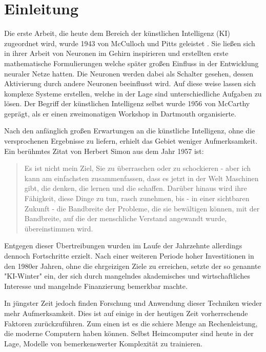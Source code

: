 \section{Einleitung}

Die erste Arbeit, die heute dem Bereich der künstlichen Intelligenz (KI) zugeordnet wird, wurde 1943 von McCulloch und Pitts geleistet \cite{McCulloch1943}.
Sie ließen sich in ihrer Arbeit von Neuronen im Gehirn inspirieren und erstellten erste mathematische Formulierungen welche später großen Einfluss in der Entwicklung neuraler Netze hatten.
Die Neuronen werden dabei als Schalter gesehen, dessen Aktivierung durch andere Neuronen beeinflusst wird.
Auf diese weise lassen sich komplexe Systeme erstellen, welche in der Lage sind unterschiedliche Aufgaben zu lösen.
Der Begriff der künstlichen Intelligenz selbst wurde 1956 von McCarthy geprägt, als er einen zweimonatigen Workshop in Dartmouth \cite{McCarthy1955} organisierte.

Nach den anfänglich großen Erwartungen an die künstliche Intelligenz, ohne die versprochenen Ergebnisse zu liefern, erhielt das Gebiet weniger Aufmerksamkeit.
Ein berühmtes Zitat von Herbert Simon aus dem Jahr 1957 ist:
\begin{quotation}
    Es ist nicht mein Ziel, Sie zu überraschen oder zu schockieren - aber ich kann am einfachsten zusammenfassen, dass es jetzt in der Welt Maschinen gibt, die denken, die lernen und die schaffen. Darüber hinaus wird ihre Fähigkeit, diese Dinge zu tun, rasch zunehmen, bis - in einer sichtbaren Zukunft - die Bandbreite der Probleme, die sie bewältigen können, mit der Bandbreite, auf die der menschliche Verstand angewandt wurde, übereinstimmen wird.
\end{quotation}

Entgegen dieser Übertreibungen wurden im Laufe der Jahrzehnte allerdings dennoch Fortschritte erzielt.
Nach einer weiteren Periode hoher Investitionen in den 1980er Jahren, ohne die ehrgeizigen Ziele zu erreichen, setzte der so genannte "KI-Winter" ein, der sich durch mangelndes akademisches und wirtschaftliches Interesse und mangelnde Finanzierung bemerkbar machte.

In jüngster Zeit jedoch finden Forschung und Anwendung dieser Techniken wieder mehr Aufmerksamkeit.
Dies ist auf einige in der heutigen Zeit vorherrschende Faktoren zurückzuführen.
Zum einen ist es die schiere Menge an Rechenleistung, die moderne Computern haben können.
Selbst Heimcomputer sind heute in der Lage, Modelle von bemerkenswerter Komplexität zu trainieren.

